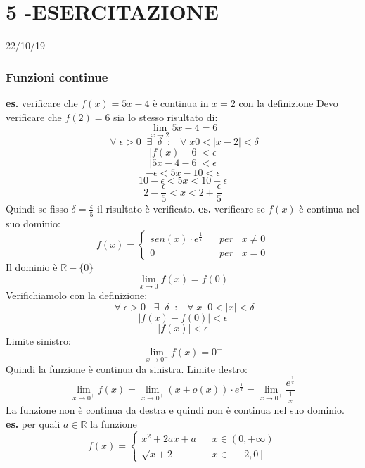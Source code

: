 \section*{5 -ESERCITAZIONE}
22/10/19
\subsubsection*{Funzioni continue}
\textbf{es.} verificare che $f(x) = 5x -4$ è continua in $x=2$ con la definizione
\newline
Devo verificare che $f(2) = 6$ sia lo stesso risultato di:
\[
    \lim_{x\rightarrow 2} 5x-4 = 6
\]
\[
    \;\forall\; \epsilon > 0 \;\; \exists \;\; \delta \;\;:\;\; \;\forall\;x 0<|x-2|<\delta 
\]
\[
    |f(x) -6| < \epsilon
\]
\[
    |5x-4-6| < \epsilon
\]
\[
    -\epsilon < 5x-10< \epsilon
\]
\[
    10-\epsilon< 5x< 10 + \epsilon
\]
\[
    2- \frac{\epsilon}{5} < x < 2 + \frac{\epsilon}{5}
\]
Quindi se fisso $\delta = \frac{\epsilon}{5}$ il risultato è verificato.
\newline
\newline
\newline
\textbf{es.} verificare se $f(x)$ è continua nel suo dominio:
\[
    f(x) = \begin{cases}
        sen(x) \cdot e^{\frac{1}{x}} &\;\;\; per \;\;\; x\neq 0 \\
        0 & \;\;\;per \;\;\; x=0
    \end{cases}
\]
Il dominio è $\mathbb{R} - \{0\}$
\[
    \lim_{x\rightarrow 0 }f(x) = f(0)
\]
Verifichiamolo con la definizione:
\[
    \;\forall\; \epsilon> 0 \;\;\;\exists \;\; \delta \;\;:\;\; \;\forall\;x \;\; 0< |x|< \delta
\]
\[
    |f(x)-f(0)|<\epsilon
\]
\[
    |f(x)| < \epsilon
\]
Limite sinistro:
\[
    \lim_{x\rightarrow 0^-} f(x) = 0^-
\]
Quindi la funzione è continua da sinistra.
\newline
Limite destro:
\[
    \lim_{x\rightarrow 0^+} f(x) = \lim_{x\rightarrow 0^+}(x + o(x))\cdot  e ^{\frac{1}{x}} = \lim_{x\rightarrow 0^+} \frac{e^{\frac{1}{x}}}{\frac{1}{x}}
\]
La funzione non è continua da destra e quindi non è continua nel suo dominio.
\newline
\newline
\newline
\textbf{es.} per quali $ a \in \mathbb{R}$ la funzione
\[
    f(x) = \begin{cases}
        x^2 +2ax +a \;\;\;& x \in (0,+\infty) \\
        \sqrt{x+2}&x \in [-2,0]
    \end{cases}
\] 
